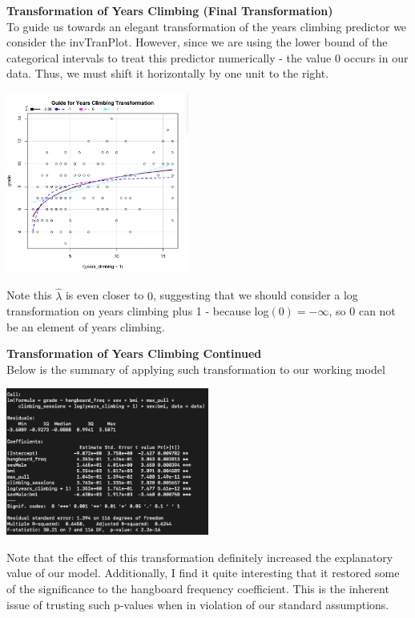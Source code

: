 \documentclass[11pt]{amsart}
\begin{document}
\vspace{0.3in}
{\bf\large Transformation of Years Climbing (Final Transformation)}\\
To guide us towards an elegant transformation of the years climbing predictor we consider the invTranPlot.
However, since we are using the lower bound of the categorical intervals to treat this predictor numerically - the value $0$ occurs in our data.
Thus, we must shift it horizontally by one unit to the right. 
\begin{center}
\includegraphics[width=0.45\textwidth]{tran2}
\end{center}
Note this $\hat\lambda$ is even closer to $0$, suggesting that we should consider a log transformation on years climbing plus 1 - because log$(0) = -\infty$, so $0$ can not be an element of years climbing.

\newpage
{\bf\large Transformation of Years Climbing Continued}\\
Below is the summary of applying such transformation to our working model\\

\begin{center}
\includegraphics[width=0.5\textwidth]{tran_mod2}
\end{center}

Note that the effect of this transformation definitely increased the explanatory value of our model. Additionally, I find it quite interesting that it restored some of the significance to the hangboard frequency coefficient. This is the inherent issue of trusting such p-values when in violation of our standard assumptions.\\
\end{document}
